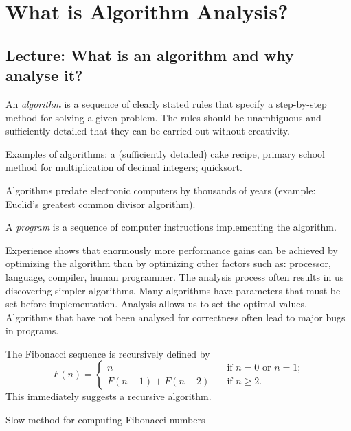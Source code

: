 \part{What is Algorithm Analysis?} \label{ch:alganal}

\chapter{Lecture: What is an algorithm and why analyse it?}


An \emph{algorithm} is a sequence of clearly stated rules that
specify a step-by-step method for solving a given problem.
The rules should be unambiguous and
sufficiently detailed that they can be carried out without creativity.

Examples of algorithms: a (sufficiently detailed) cake recipe,
primary school method for multiplication of decimal integers; quicksort.

Algorithms predate electronic computers by thousands of years (example:
Euclid's greatest common divisor algorithm).

A \emph{program} is a sequence of computer instructions implementing the 
algorithm.

Experience shows that enormously more performance gains can be achieved 
by optimizing the algorithm than by optimizing other factors such as:
processor, language, compiler, human programmer.
The analysis process often results in us discovering simpler algorithms.
Many algorithms have parameters that must be set before implementation. 
Analysis allows us to set the optimal values.
Algorithms that have not been analysed for correctness often lead to 
major bugs in programs.


\begin{example}
The Fibonacci sequence is recursively defined by 
$$
F(n) = 
\begin{cases}
n & \quad \text{if $n = 0$ or $n = 1$;} \\
F(n - 1) + F(n - 2) & \quad \text{if $n \geq 2$.} 
\end{cases}
$$
This immediately suggests a recursive algorithm.
\end{example}

\begin{algorithm}[H]
  \caption{Slow method for computing Fibonacci numbers
    \label{alg:slowfib}}
\begin{algorithmic}[1]
\EndIf
\EndFunction
\end{algorithmic}
\end{algorithm}
\fi

